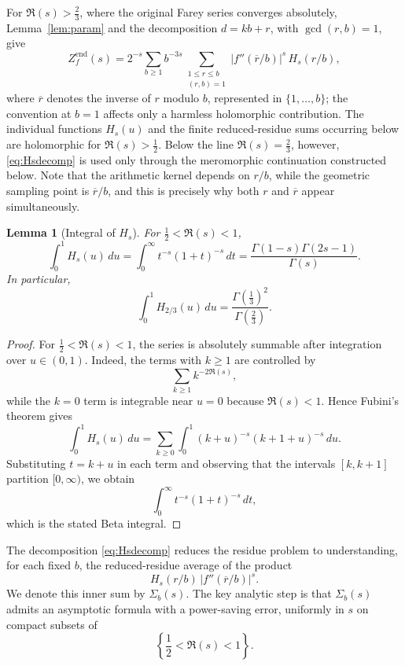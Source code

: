 \documentclass[a4paper,american,11pt]{amsart}
\theoremstyle{plain}
\newtheorem{lemma}[theorem]{Lemma}
\theoremstyle{definition}
\begin{document}
For \(\Re(s)>\frac23\), where the original Farey series converges
absolutely, Lemma~\ref{lem:param} and the decomposition
\(d=kb+r\), with \(\gcd(r,b)=1\), give
\begin{equation}
\label{eq:Hsdecomp}
Z_f^{\mathrm{end}}(s)
=
2^{-s}
\sum_{b\ge1}b^{-3s}
\sum_{\substack{1\le r\le b\\(r,b)=1}}
|f''(\overline r/b)|^s\,H_s(r/b),
\end{equation}
where \(\overline r\) denotes the inverse of \(r\) modulo \(b\), represented in
\(\{1,\dots,b\}\); the convention at \(b=1\) affects only a harmless
holomorphic contribution. The individual functions \(H_s(u)\) and the
finite reduced-residue sums occurring below are holomorphic for
\(\Re(s)>\frac12\). Below the line \(\Re(s)=\frac23\), however,
\eqref{eq:Hsdecomp} is used only through the meromorphic continuation
constructed below. Note that the arithmetic kernel depends on \(r/b\),
while the geometric sampling point is \(\overline r/b\), and this is
precisely why both \(r\) and \(\overline r\) appear simultaneously.

\begin{lemma}[Integral of \(H_s\)]
\label{lem:intHs}
For \(\frac12<\Re(s)<1\),
\[
\int_0^1 H_s(u)\,du
=
\int_0^\infty t^{-s}(1+t)^{-s}\,dt
=
\frac{\Gamma(1-s)\Gamma(2s-1)}{\Gamma(s)}.
\]
In particular,
\[
\int_0^1 H_{2/3}(u)\,du
=
\frac{\Gamma\!\left(\frac13\right)^2}{\Gamma\!\left(\frac23\right)}.
\]
\end{lemma}

\begin{proof}
For \(\frac12<\Re(s)<1\), the series is absolutely summable after
integration over \(u\in(0,1)\). Indeed, the terms with \(k\ge1\) are
controlled by
\[
\sum_{k\ge1}k^{-2\Re(s)},
\]
while the \(k=0\) term is integrable near \(u=0\) because
\(\Re(s)<1\). Hence Fubini's theorem gives
\[
\int_0^1 H_s(u)\,du
=
\sum_{k\ge0}\int_0^1
(k+u)^{-s}(k+1+u)^{-s}\,du.
\]
Substituting \(t=k+u\) in each term and observing that the intervals
\([k,k+1]\) partition \([0,\infty)\), we obtain
\[
\int_0^\infty t^{-s}(1+t)^{-s}\,dt,
\]
which is the stated Beta integral.
\end{proof}

The decomposition \eqref{eq:Hsdecomp} reduces the residue problem to
understanding, for each fixed \(b\), the reduced-residue average of the product
\[
H_s(r/b)\,|f''(\overline r/b)|^s.
\]
We denote this inner sum by \(\Sigma_b(s)\). The key analytic step is that
\(\Sigma_b(s)\) admits an asymptotic formula with a power-saving error,
uniformly in \(s\) on compact subsets of
\[
\left\{\frac12<\Re(s)<1\right\}.
\]
\end{document}
